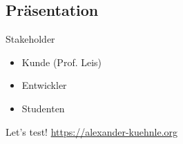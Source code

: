 \subsection{Präsentation}

\begin{frame}{\insertsectionhead}

  \begin{block}{Stakeholder}
    \begin{itemize}
      \item Kunde (Prof. Leis)
      \item Entwickler
      \pause
      \item Studenten
    \end{itemize}
  \end{block}

  \pause

  \begin{block}{\centering Let's test!}
    \centering\href{https://alexander-kuehnle.org}{https://alexander-kuehnle.org}
  \end{block}
\end{frame}

